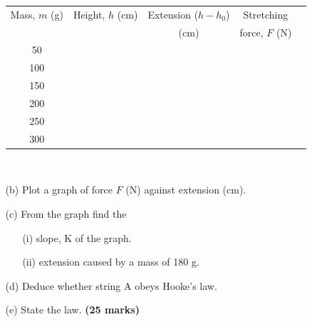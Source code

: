 \begin{enumerate}
\begin{enumerate}
\begin{tabular}{|c|c|c|c|c} \hline
Mass, $m$ (g) & Height, $h$ (cm) & Extension ($h - h_0$) & Stretching \\
&&(cm)&force, $F$ (N) \\ \hline
50&&& \\ 
100&&& \\ 
150&&& \\ 
200&&& \\ 
250&&& \\ 
300&&& \\ \hline
\end{tabular}\\[10pt]
\item[(b)] Plot a graph of force $F$ (N) against extension (cm).
\item[(c)] From the graph find the
\begin{enumerate}
\item[(i)] slope, K of the graph.
\item[(ii)] extension caused by a mass of 180 g.
\end{enumerate}
\item[(d)] Deduce whether string A obeys Hooke's law.
\item[(e)] State the law. \hfill \textbf{(25 marks)}
\end{enumerate}
\end{enumerate}

